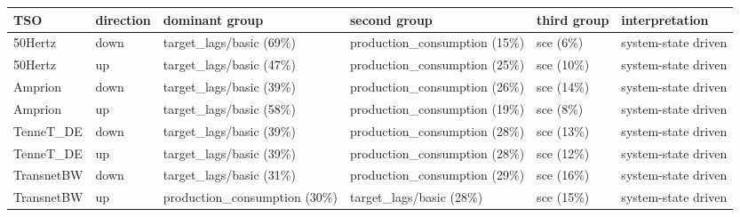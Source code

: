 \begin{tabular}{llllll}
\toprule
TSO & direction & dominant group & second group & third group & interpretation \\
\midrule
50Hertz & down & target\_lags/basic (69\%) & production\_consumption (15\%) & sce (6\%) & system-state driven \\
50Hertz & up & target\_lags/basic (47\%) & production\_consumption (25\%) & sce (10\%) & system-state driven \\
Amprion & down & target\_lags/basic (39\%) & production\_consumption (26\%) & sce (14\%) & system-state driven \\
Amprion & up & target\_lags/basic (58\%) & production\_consumption (19\%) & sce (8\%) & system-state driven \\
TenneT\_DE & down & target\_lags/basic (39\%) & production\_consumption (28\%) & sce (13\%) & system-state driven \\
TenneT\_DE & up & target\_lags/basic (39\%) & production\_consumption (28\%) & sce (12\%) & system-state driven \\
TransnetBW & down & target\_lags/basic (31\%) & production\_consumption (29\%) & sce (16\%) & system-state driven \\
TransnetBW & up & production\_consumption (30\%) & target\_lags/basic (28\%) & sce (15\%) & system-state driven \\
\bottomrule
\end{tabular}
